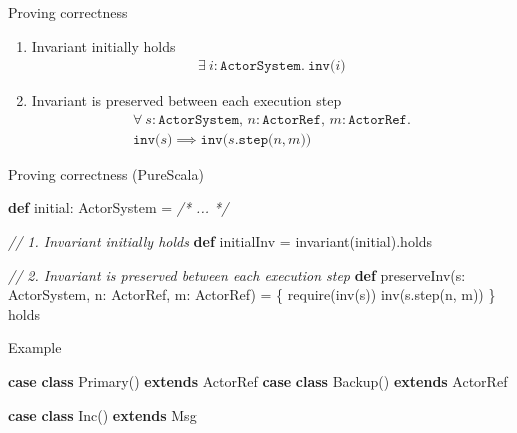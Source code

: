 \documentclass[ignorenonframetext,]{beamer}
\newenvironment{Shaded}{}{}
\newcommand{\CommentTok}[1]{\textcolor[rgb]{0.38,0.63,0.69}{\textit{#1}}}
\newcommand{\FunctionTok}[1]{\textcolor[rgb]{0.02,0.16,0.49}{#1}}
\newcommand{\KeywordTok}[1]{\textcolor[rgb]{0.00,0.44,0.13}{\textbf{#1}}}
\newcommand{\NormalTok}[1]{#1}
\begin{document}
\begin{frame}{%
\protect\hypertarget{proving-correctness}{%
Proving correctness}}

\begin{enumerate}
[1.]
\item
  Invariant initially holds \begin{gather*}
  \exists\ i: \texttt{ActorSystem}.\ \texttt{inv($i$)} 
  \end{gather*}
\item
  Invariant is preserved between each execution step \begin{gather*}
  \forall\ s: \texttt{ActorSystem},\, n: \texttt{ActorRef},\, m: \texttt{ActorRef}.\\
  \texttt{inv($s$)} \implies \texttt{inv($s$.step($n, m$))}
  \end{gather*}
\end{enumerate}

\end{frame}

\begin{frame}[fragile]{%
\protect\hypertarget{proving-correctness-purescala}{%
Proving correctness (PureScala)}}

\begin{Shaded}
\begin{Highlighting}[]
\KeywordTok{def}\NormalTok{ initial: ActorSystem = }\CommentTok{/* ... */}

\CommentTok{// 1. Invariant initially holds}
\KeywordTok{def}\NormalTok{ initialInv = }\FunctionTok{invariant}\NormalTok{(initial).}\FunctionTok{holds}

\CommentTok{// 2. Invariant is preserved between each execution step}
\KeywordTok{def} \FunctionTok{preserveInv}\NormalTok{(s: ActorSystem, n: ActorRef, m: ActorRef) = \{}
  \FunctionTok{require}\NormalTok{(}\FunctionTok{inv}\NormalTok{(s))}
  \FunctionTok{inv}\NormalTok{(s.}\FunctionTok{step}\NormalTok{(n, m))}
\NormalTok{\} holds}
\end{Highlighting}
\end{Shaded}

\end{frame}

\begin{frame}[fragile]{%
\protect\hypertarget{example-1}{%
Example}}

\begin{Shaded}
\begin{Highlighting}[]
\KeywordTok{case} \KeywordTok{class} \FunctionTok{Primary}\NormalTok{() }\KeywordTok{extends}\NormalTok{ ActorRef}
\KeywordTok{case} \KeywordTok{class} \FunctionTok{Backup}\NormalTok{()  }\KeywordTok{extends}\NormalTok{ ActorRef}

\KeywordTok{case} \KeywordTok{class} \FunctionTok{Inc}\NormalTok{() }\KeywordTok{extends}\NormalTok{ Msg}
\end{Highlighting}
\end{Shaded}

\end{frame}
\end{document}
